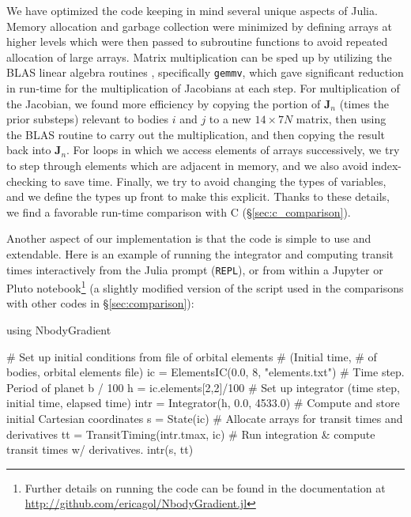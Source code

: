 \documentclass[fleqn,usenatbib,twocolumn]{mnras}
\newcommand   {\change}[1] {{\color{black}{#1}}}
\begin{document}
We have optimized the code keeping in mind several unique aspects of Julia.
Memory allocation and garbage collection were minimized by defining arrays
at higher levels which were then passed to subroutine functions to avoid
repeated allocation of large arrays.  Matrix multiplication can be sped up
by utilizing the BLAS linear algebra routines \citep{Blackford2002}, specifically \texttt{gemmv}, which
gave significant reduction in run-time for the multiplication of Jacobians at each
step.  For multiplication of the \change{$\mathbf{J}_{\mathrm{DK/KD},ij}$} Jacobian, we found
more efficiency by copying the portion of $\mathbf{J}_n$ (times the prior
substeps) relevant to bodies $i$ and $j$ to a new $14\times 7N$ matrix, then
using the BLAS routine to carry out the multiplication, and then copying the result
back into $\mathbf{J}_n$.  For loops in which we access elements of arrays
successively, we try to step through elements which are adjacent in memory, and we also avoid index-checking to save time.
Finally, we try to avoid changing the types of variables, and we define the
types up front to make this explicit.  Thanks to these details, we find a favorable run-time comparison with C (\S \ref{sec:c_comparison}).

Another aspect of our implementation is that the code is simple to use and extendable. Here is an example of running the integrator and computing transit times interactively from the Julia prompt (\texttt{REPL}), or from within a Jupyter or Pluto notebook\footnote{Further details on running the code can be found in the documentation at \url{http://github.com/ericagol/NbodyGradient.jl}} (a slightly modified version of the script used in the comparisons with other codes in \S \ref{sec:comparison}):

{\Large
\begin{jllisting}[xleftmargin=0.0pt, xrightmargin=0.53\textwidth, frame=lines, rulecolor=\color{black}]
using NbodyGradient

# Set up initial conditions from file of orbital elements
# (Initial time, # of bodies, orbital elements file)
ic = ElementsIC(0.0, 8, "elements.txt")
# Time step. Period of planet b / 100
h = ic.elements[2,2]/100
# Set up integrator (time step, initial time, elapsed time)
intr = Integrator(h, 0.0, 4533.0)
# Compute and store initial Cartesian coordinates
s = State(ic)
# Allocate arrays for transit times and derivatives
tt = TransitTiming(intr.tmax, ic)
# Run integration & compute transit times w/ derivatives.
intr(s, tt)
\end{jllisting}}
\end{document}
